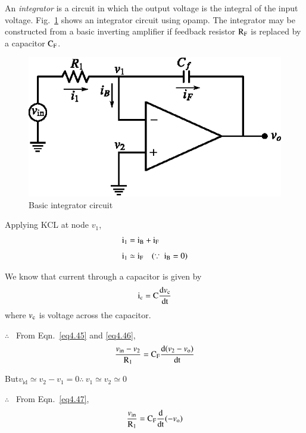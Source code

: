 An {\em integrator} is a circuit in which the output voltage is the integral of the input voltage. Fig.~\ref{fig4.13} shows an integrator circuit using opamp. The integrator may be constructed from a basic inverting amplifier if feedback resistor $\textrm{R}_{\textrm{F}}$ is replaced by a capacitor $\textrm{C}_{\textrm{F}}$.
\begin{figure}[H]
\centering
\includegraphics{chap4/fig4.13.eps}
\caption{Basic integrator circuit}\label{fig4.13}
\end{figure}

Applying KCL at node $v_{1}$,
\begin{align}
\rmi_{1} &= \rmi_{\rmB}+\rmi_{\rmF}\label{eq4.44}\\[4pt]
\rmi_{1} &\simeq \rmi_{\rmF}\quad (\because \ \rmi_{\rmB}=0)\label{eq4.45}
\end{align}

\eject

We know that current through a capacitor is given by
\begin{equation}
\textrm{i}_{\textrm{c}} = \textrm{C}\frac{\textrm{d} v_{\textrm{c}}}{\operatorname{dt}}\label{eq4.46}
\end{equation}
where $v_{\textrm{c}}$ is voltage across the capacitor.

$\therefore$~ From Eqn.~\eqref{eq4.45} and \eqref{eq4.46},
\begin{equation}
\frac{v_{\text{in}}-v_{2}}{\textrm{R}_{1}}=\textrm{C}_{\textrm{F}}\dfrac{\textrm{d} (v_{2}-v_{\textrm{o}})}{\operatorname{dt}}\label{eq4.47}
\end{equation}

But\quad $v_{\text{id}}\simeq v_{2}-v_{1}=0$\quad $\therefore~ v_{1}\simeq v_{2}\simeq 0$

$\therefore$~ From Eqn.~\eqref{eq4.47},
\begin{equation}
\frac{v_{\text{in}}}{\textrm{R}_{1}}=\textrm{C}_{\textrm{F}}\frac{\textrm{d}}{\operatorname{dt}}(-v_{\textrm{o}})\label{eq4.48}
\end{equation}

